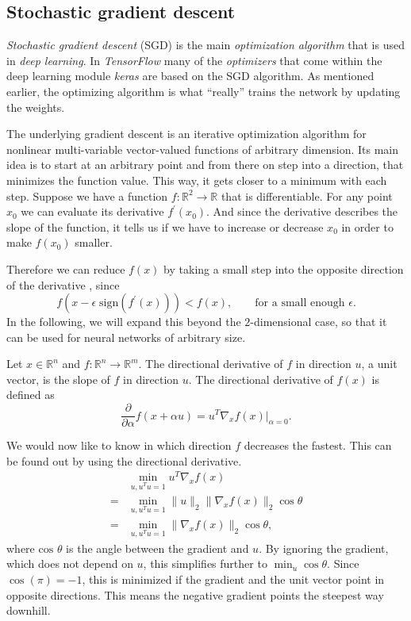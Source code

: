 \subsection{Stochastic gradient descent}
\label{sec:stochastic-gradient-descent}
\emph{Stochastic gradient descent} (SGD) is the main \emph{optimization algorithm} that is used in \emph{deep learning}.
In \emph{TensorFlow} \cite{tensorflow2015-whitepaper} many of the \emph{optimizers} that come within the deep learning module \emph{keras} are based on the SGD algorithm.
As mentioned earlier, the optimizing algorithm is what \enquote{really} trains the network by updating the weights.

The underlying gradient descent is an iterative optimization algorithm for nonlinear multi-variable vector-valued functions of arbitrary dimension.
Its main idea is to start at an arbitrary point and from there on step into a direction, that minimizes the function value.
This way, it gets closer to a minimum with each step.
Suppose we have a function \(f : \mathbb{R}^2 \rightarrow \mathbb{R}\) that is differentiable.
For any point \(x_0\) we can evaluate its derivative \(f^{\prime}(x_0)\).
And since the derivative describes the slope of the function, it tells us if we have to increase or decrease \(x_0\) in order to make \(f(x_0)\) smaller.

Therefore we can reduce \(f(x)\) by taking a small step into the opposite direction of the derivative \cite{cauchy}, since
\begin{equation}
    \label{eq:cauchy}
    f(x - \epsilon \; \text{sign}(f^{\prime}(x))) < f(x), \qquad \text{for a small enough } \epsilon.
\end{equation}
In the following, we will expand this beyond the \(2\)-dimensional case, so that it can be used for neural networks of arbitrary size.

Let \(x \in \mathbb{R}^n\) and \(f : \mathbb{R}^n \rightarrow \mathbb{R}^m\).
The directional derivative of \(f\) in direction \(u\), a unit vector, is the slope of \(f\) in direction \(u\).
The directional derivative of \(f(x)\) is defined as 
\begin{equation}
    \frac{\partial}{\partial \alpha} f(x + \alpha u) = u^{T} \nabla_x f(x) \big\vert_{\alpha = 0}.
\end{equation}

We would now like to know in which direction \(f\) decreases the fastest.
This can be found out by using the directional derivative.
\begin{align}
      &\min_{u, u^{T}u = 1} u^{T} \nabla_x f(x) \\
    = &\min_{u, u^{T}u = 1} \lVert u \rVert_2 \lVert \nabla_x f(x) \rVert_2 \cos \theta \\
    = &\min_{u, u^{T}u = 1} \lVert \nabla_x f(x) \rVert_2 \cos \theta,
\end{align}
where \(\text{cos } \theta\) is the angle between the gradient and \(u\).
By ignoring the gradient, which does not depend on \(u\), this simplifies further to \(\min_{u} \cos \theta\).
Since \(\cos(\pi) = -1\), this is minimized if the gradient and the unit vector point in opposite directions.
This means the negative gradient points the steepest way downhill.

